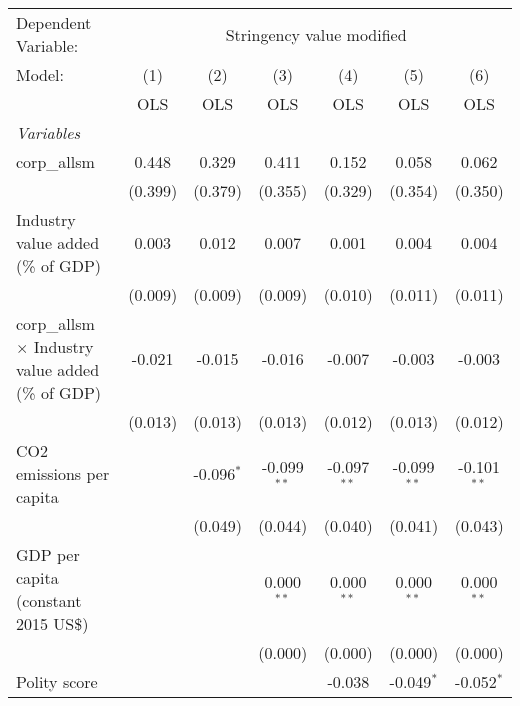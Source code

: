 
\begingroup
\centering
\begin{tabular}{lcccccc}
   \toprule
   Dependent Variable: & \multicolumn{6}{c}{Stringency value modified}\\
   Model:                                                   & (1)     & (2)          & (3)           & (4)           & (5)           & (6)\\  
                                                            &  OLS    & OLS          & OLS           & OLS           & OLS           & OLS\\  
   \midrule
   \emph{Variables}\\
   corp\_allsm                                              & 0.448   & 0.329        & 0.411         & 0.152         & 0.058         & 0.062\\   
                                                            & (0.399) & (0.379)      & (0.355)       & (0.329)       & (0.354)       & (0.350)\\   
   Industry value added (\% of GDP)                         & 0.003   & 0.012        & 0.007         & 0.001         & 0.004         & 0.004\\   
                                                            & (0.009) & (0.009)      & (0.009)       & (0.010)       & (0.011)       & (0.011)\\   
   corp\_allsm $\times$ Industry value added (\% of GDP)    & -0.021  & -0.015       & -0.016        & -0.007        & -0.003        & -0.003\\   
                                                            & (0.013) & (0.013)      & (0.013)       & (0.012)       & (0.013)       & (0.012)\\   
   CO2 emissions per capita                                 &         & -0.096$^{*}$ & -0.099$^{**}$ & -0.097$^{**}$ & -0.099$^{**}$ & -0.101$^{**}$\\   
                                                            &         & (0.049)      & (0.044)       & (0.040)       & (0.041)       & (0.043)\\   
   GDP per capita (constant 2015 US\$)                      &         &              & 0.000$^{**}$  & 0.000$^{**}$  & 0.000$^{**}$  & 0.000$^{**}$\\   
                                                            &         &              & (0.000)       & (0.000)       & (0.000)       & (0.000)\\   
   Polity score                                             &         &              &               & -0.038        & -0.049$^{*}$  & -0.052$^{*}$\\   

\end{tabular}
